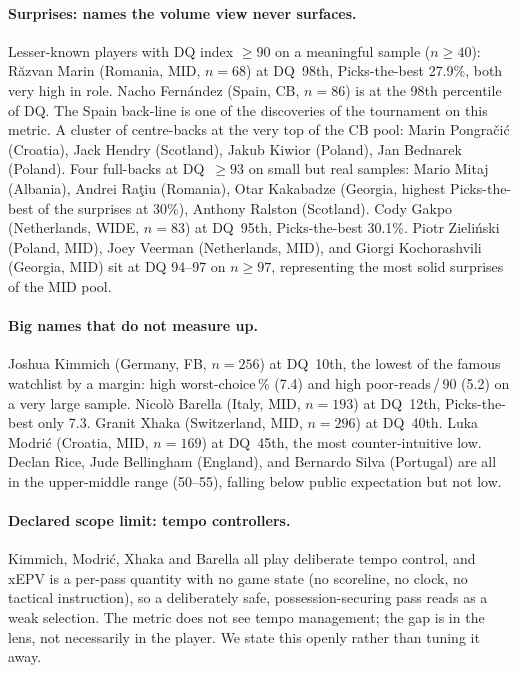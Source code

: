 \documentclass[12pt,a4paper]{article}
\begin{document}
\paragraph{Surprises: names the volume view never surfaces.}
Lesser-known players with DQ index $\geq 90$ on a meaningful sample ($n \geq 40$):
R\u{a}zvan Marin (Romania, MID, $n=68$) at DQ~98th, Picks-the-best 27.9\%, both very high in role.
Nacho Fern\'{a}ndez (Spain, CB, $n=86$) is at the 98th percentile of DQ. The Spain back-line is one of the discoveries of the tournament on this metric.
A cluster of centre-backs at the very top of the CB pool: Marin Pongra\v{c}i\'{c} (Croatia), Jack Hendry (Scotland), Jakub Kiwior (Poland), Jan Bednarek (Poland).
Four full-backs at DQ~$\geq 93$ on small but real samples: Mario Mitaj (Albania), Andrei Ra\c{t}iu (Romania), Otar Kakabadze (Georgia, highest Picks-the-best of the surprises at 30\%), Anthony Ralston (Scotland).
Cody Gakpo (Netherlands, WIDE, $n=83$) at DQ~95th, Picks-the-best 30.1\%.
Piotr Zieli\'{n}ski (Poland, MID), Joey Veerman (Netherlands, MID), and Giorgi Kochorashvili (Georgia, MID) sit at DQ 94--97 on $n \geq 97$, representing the most solid surprises of the MID pool.

\paragraph{Big names that do not measure up.}
Joshua Kimmich (Germany, FB, $n=256$) at DQ~10th, the lowest of the famous watchlist by a margin: high worst-choice\,\% (7.4) and high poor-reads\,/\,90 (5.2) on a very large sample.
Nicol\`{o} Barella (Italy, MID, $n=193$) at DQ~12th, Picks-the-best only 7.3.
Granit Xhaka (Switzerland, MID, $n=296$) at DQ~40th.
Luka Modri\'{c} (Croatia, MID, $n=169$) at DQ~45th, the most counter-intuitive low.
Declan Rice, Jude Bellingham (England), and Bernardo Silva (Portugal) are all in the upper-middle range (50--55), falling below public expectation but not low.

\paragraph{Declared scope limit: tempo controllers.}
Kimmich, Modri\'{c}, Xhaka and Barella all play deliberate tempo control, and xEPV is a per-pass quantity with no game state (no scoreline, no clock, no tactical instruction), so a deliberately safe, possession-securing pass reads as a weak selection.
The metric does not see tempo management; the gap is in the lens, not necessarily in the player.
We state this openly rather than tuning it away.
\end{document}

